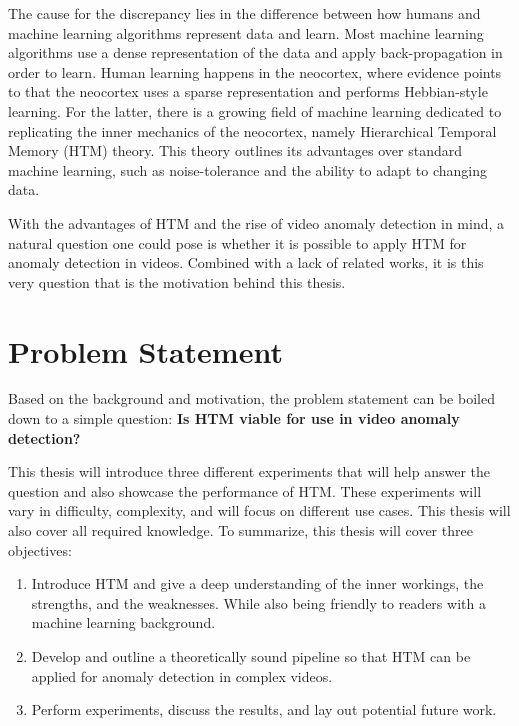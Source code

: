 The cause for the discrepancy lies in the difference between how humans and machine learning algorithms represent data and learn. Most machine learning algorithms use a dense representation of the data and apply back-propagation in order to learn. Human learning happens in the neocortex, where evidence points to that the neocortex uses a sparse representation and performs Hebbian-style learning. For the latter, there is a growing field of machine learning dedicated to replicating the inner mechanics of the neocortex, namely Hierarchical Temporal Memory (HTM) theory. This theory outlines its advantages over standard machine learning, such as noise-tolerance and the ability to adapt to changing data.
\par
With the advantages of HTM and the rise of video anomaly detection in mind, a natural question one could pose is whether it is possible to apply HTM for anomaly detection in videos. Combined with a lack of related works, it is this very question that is the motivation behind this thesis.
\section{Problem Statement}
Based on the background and motivation, the problem statement can be boiled down to a simple question: \textbf{Is HTM viable for use in video anomaly detection?}\par
This thesis will introduce three different experiments that will help answer the question and also showcase the performance of HTM. These experiments will vary in difficulty, complexity, and will focus on different use cases. This thesis will also cover all required knowledge. To summarize, this thesis will cover three objectives:
\begin{enumerate}
    \item Introduce HTM and give a deep understanding of the inner workings, the strengths, and the weaknesses. While also being friendly to readers with a machine learning background.
    \item Develop and outline a theoretically sound pipeline so that HTM can be applied for anomaly detection in complex videos.
    \item Perform experiments, discuss the results, and lay out potential future work.
\end{enumerate}
